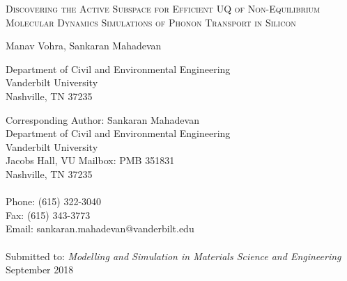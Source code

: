 \begin{center}
\textsc{
Discovering the Active Subspace for Efficient UQ of Non-Equilibrium
Molecular Dynamics Simulations of Phonon Transport in Silicon
}

\bigskip 
\bigskip 

Manav Vohra, Sankaran Mahadevan

\bigskip
\bigskip

\normalsize
Department of Civil and Environmental Engineering\\
Vanderbilt University\\
Nashville, TN 37235\\

\end{center}

\vspace{6cm}

\begin{tabbing}
Corresponding Author: \hspace{5mm} \= Sankaran Mahadevan\\
       \>  Department of Civil and Environmental Engineering\\
       \>  Vanderbilt University\\
        Jacobs Hall, VU Mailbox: PMB 351831 \\
       \>  Nashville, TN 37235 \\
       \> \\
Phone: \> (615) 322-3040 \\
Fax:   \> (615) 343-3773 \\
Email: \>  sankaran.mahadevan@vanderbilt.edu   \\
\\
Submitted to: \> \textit{Modelling and Simulation in Materials Science and Engineering} \\
\>  September 2018\\

\bigskip
\end{tabbing}

\clearpage

